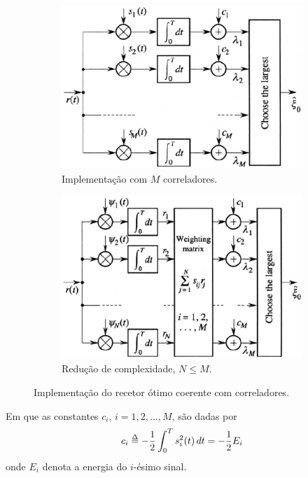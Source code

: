 \begin{figure}[ht] 
    \begin{subfigure}[b]{0.5\linewidth}
        \centering
        \includegraphics[width=0.9\linewidth]{img/digital/AWGN-transmission/detection-correlator.png}
        \caption{Implementação com $M$ correladores.} 
        \label{fig:detection-correlator} 
    \end{subfigure}%
    \begin{subfigure}[b]{0.5\linewidth}%
        \centering
        \includegraphics[width=0.9\linewidth]{img/digital/AWGN-transmission/detection-reference.png} 
        \caption{Redução de complexidade, $N \leq M$.} 
        \label{fig:detection-reference} 
    \end{subfigure}
    \caption{Implementação do recetor ótimo coerente com correladores.\cite{Benedetto1999}}
    \label{fig:} 
\end{figure}

\noindent Em que as constantes $c_i$, $i=1,2,\dots,M$, são dadas por
$$
    c_i \delequal -\frac{1}{2} \int_{0}^{T} s_i^2(t)\, dt = -\frac{1}{2} E_i
$$
onde $E_i$ denota a energia do $i$-ésimo sinal.
